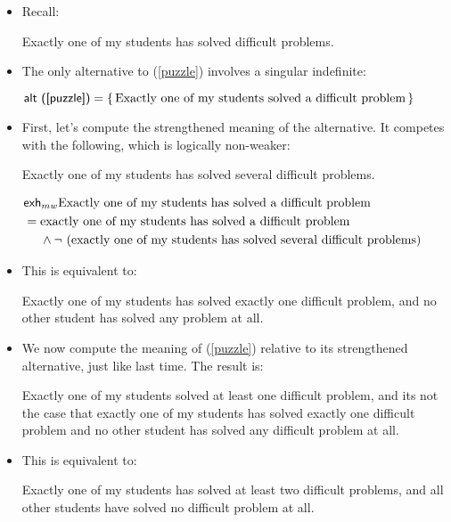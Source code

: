 \documentclass[landscape,twocolumn,cronos,paper=letter]{ling-handout}
\begin{document}
\begin{itemize}

    \item Recall:

\ex
\label{puzzle}Exactly one of my students has solved difficult problems.
\xe

  \item The only alternative to (\ref{puzzle}) involves a singular indefinite:

    \ex
    \(\ml{alt (\ref{puzzle})} = \set{\text{Exactly one of my students solved a
    difficult problem}}\)
    \xe

 \item First, let's compute the strengthened meaning of the alternative. It
    competes with the following, which is logically non-weaker:

    \ex
   Exactly one of my students has solved several difficult problems.
    \xe

    \ex
    \(\begin{aligned}[t]
      &\ml{exh}_{mw} \text{Exactly one of my students has solved a difficult
        problem}\\
      &= \begin{aligned}[t]
        &\text{exactly one of my students has solved a difficult problem}\\
        &\wedge \neg (\text{exactly one of my students has solved several
          difficult problems})
        \end{aligned}\end{aligned}\)
    \xe

  \item This is equivalent to:

    \ex
    Exactly one of my students has solved exactly one difficult problem, and no
    other student has solved any problem at all.
    \xe

    \item We now compute the meaning of (\ref{puzzle}) relative to its
    strengthened alternative, just like last time. The result is:

    \ex\label{lessbrief}
    Exactly one of my students solved at least one difficult problem, and its
    not the case that exactly one of my students has solved exactly one
    difficult problem and no other student has solved any difficult problem at all.
    \xe

  \item This is equivalent to:

    \ex\label{brief}
    Exactly one of my students has solved at least two difficult problems, and
    all other students have solved no difficult problem at all.
    \xe


\end{itemize}
\end{document}
